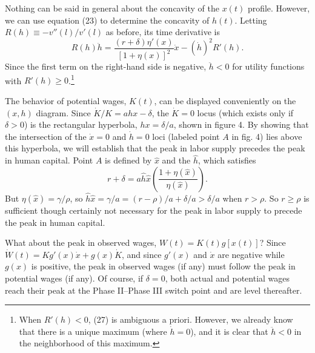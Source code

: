 \documentclass[11pt,fleqn]{article}
\begin{document}
Nothing can be said in general about the concavity of the $x(t)$ profile. However, we can use equation (23) to determine the concavity of $h(t)$. Letting $R(h) \equiv -v''(l)/v'(l)$ as before, its time derivative is
\begin{equation}
R(h)\ddot{h} = \frac{(r + \delta)\eta'(x)}{[1 + \eta(x)]^2} \dot{x} - (\dot{h})^2 R'(h).
\end{equation}
Since the first term on the right-hand side is negative, $\ddot{h} < 0$ for utility functions with $R'(h) \geq 0$.\footnote{When $R'(h) < 0$, (27) is ambiguous a priori. However, we already know that there is a unique maximum (where $\dot{h} = 0$), and it is clear that $\ddot{h} < 0$ in the neighborhood of this maximum.}

The behavior of potential wages, $K(t)$, can be displayed conveniently on the $(x, h)$ diagram. Since $\dot{K}/K = ahx - \delta$, the $\dot{K} = 0$ locus (which exists only if $\delta > 0$) is the rectangular hyperbola, $hx = \delta/a$, shown in figure 4. By showing that the intersection of the $\dot{x} = 0$ and $\dot{h} = 0$ loci (labeled point $A$ in fig. 4) lies above this hyperbola, we will establish that the peak in labor supply precedes the peak in human capital. Point $A$ is defined by $\hat{x}$ and the $\hat{h}$, which satisfies
\[
r + \delta = a\hat{h}\hat{x} \left( \frac{1 + \eta(\hat{x})}{\eta(\hat{x})} \right).
\]
But $\eta(\hat{x}) = \gamma/\rho$, so $\hat{h}\hat{x} = \gamma/a = (r - \rho)/a + \delta/a > \delta/a$ when $r > \rho$. So $r \geq \rho$ is sufficient though certainly not necessary for the peak in labor supply to precede the peak in human capital.

What about the peak in observed wages, $W(t) = K(t)g[x(t)]$? Since $\dot{W}(t) = K g'(x)\dot{x} + g(x)\dot{K}$, and since $g'(x)$ and $\dot{x}$ are negative while $g(x)$ is positive, the peak in observed wages (if any) must follow the peak in potential wages (if any). Of course, if $\delta = 0$, both actual and potential wages reach their peak at the Phase II--Phase III switch point and are level thereafter.
\end{document}
